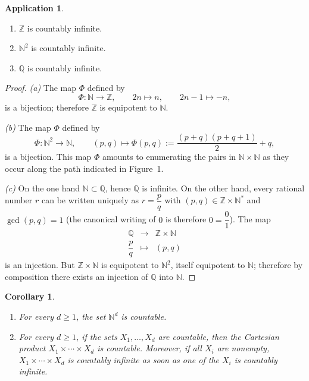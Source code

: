 \documentclass[12pt]{article}
\newtheorem{corollary}{Corollary}[section]
\theoremstyle{definition}
\newtheorem{application}{Application}[section]
\begin{document}
\begin{application}
\begin{enumerate}[label=(\alph*),leftmargin=2em]
\item $\mathbb Z$ is countably infinite.
\item $\mathbb N^2$ is countably infinite.
\item $\mathbb Q$ is countably infinite.
\end{enumerate}
\end{application}

\begin{proof}
\emph{(a)} The map $\Phi$ defined by
\[
\Phi:\mathbb N\longrightarrow\mathbb Z,\qquad
2n\longmapsto n,\qquad
2n-1\longmapsto -n,
\]
is a bijection; therefore $\mathbb Z$ is equipotent to $\mathbb N$.

\emph{(b)} The map $\Phi$ defined by
\[
\Phi:\mathbb N^2\longrightarrow\mathbb N,\qquad
(p,q)\longmapsto \Phi(p,q):=\frac{(p+q)(p+q+1)}{2}+q,
\]
is a bijection.
This map $\Phi$ amounts to enumerating the pairs in $\mathbb N\times\mathbb N$ as they occur along the path indicated in Figure~1.

\emph{(c)} On the one hand $\mathbb N\subset\mathbb Q$, hence $\mathbb Q$ is infinite.
On the other hand, every rational number $r$ can be written uniquely as $r=\dfrac{p}{q}$ with $(p,q)\in\mathbb Z\times\mathbb N^{\!*}$ and $\gcd(p,q)=1$ (the canonical writing of $0$ is therefore $0=\dfrac{0}{1}$).
The map
\[
\begin{array}{rcl}
\mathbb Q &\longrightarrow& \mathbb Z\times\mathbb N\\[2pt]
\dfrac{p}{q} &\longmapsto& (p,q)
\end{array}
\]
is an injection.
But $\mathbb Z\times\mathbb N$ is equipotent to $\mathbb N^2$, itself equipotent to $\mathbb N$; therefore by composition there exists an injection of $\mathbb Q$ into $\mathbb N$.
\end{proof}

\begin{corollary}
\begin{enumerate}[label=(\alph*),leftmargin=2em]
\item For every $d\ge 1$, the set $\mathbb N^{d}$ is countable.
\item For every $d\ge 1$, if the sets $X_1,\dots,X_d$ are countable, then the Cartesian product $X_1\times\cdots\times X_d$ is countable.
Moreover, if all $X_i$ are nonempty, $X_1\times\cdots\times X_d$ is countably infinite as soon as one of the $X_i$ is countably infinite.
\end{enumerate}
\end{corollary}
\end{document}
